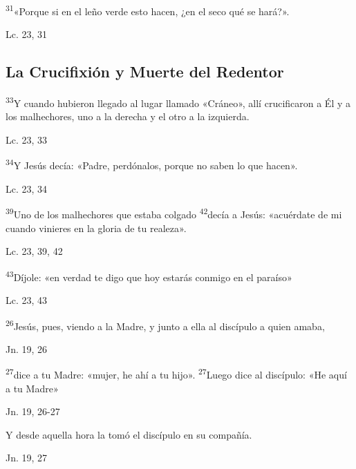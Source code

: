 \documentclass[a4paper,11pt]{article}
\begin{document}
      
      \textsuperscript{31}«Porque si en el leño verde esto hacen, ¿en el seco qué se hará?».
      \begin{flushright}
        Lc. 23, 31
      \end{flushright}

    \subsection*{\hfil La Crucifixión y Muerte del Redentor \hfil}
      
      \textsuperscript{33}Y cuando hubieron llegado al lugar llamado «Cráneo», allí crucificaron a Él y a los malhechores, uno a la derecha y el otro a la izquierda.
      \begin{flushright}
        Lc. 23, 33
      \end{flushright}

      \textsuperscript{34}Y Jesús decía: «Padre, perdónalos, porque no saben lo que hacen».
      \begin{flushright}
        Lc. 23, 34
      \end{flushright}

      \textsuperscript{39}Uno de los malhechores que estaba colgado \textsuperscript{42}decía a Jesús: «acuérdate de mi cuando vinieres en la gloria de tu realeza».
      \begin{flushright}
        Lc. 23, 39, 42
      \end{flushright}

      \textsuperscript{43}Díjole: «en verdad te digo que hoy estarás conmigo en el paraíso»
      \begin{flushright}
        Lc. 23, 43
      \end{flushright}

      \textsuperscript{26}Jesús, pues, viendo a la Madre, y junto a ella al discípulo a quien amaba,
      \begin{flushright}
        Jn. 19, 26
      \end{flushright}

      \textsuperscript{27}dice a tu Madre: «mujer, he ahí a tu hijo». \textsuperscript{27}Luego dice al discípulo: «He aquí a tu Madre»
      \begin{flushright}
        Jn. 19, 26-27
      \end{flushright}

      Y desde aquella hora la tomó el discípulo en su compañía.
      \begin{flushright}
        Jn. 19, 27
      \end{flushright}
\end{document}
